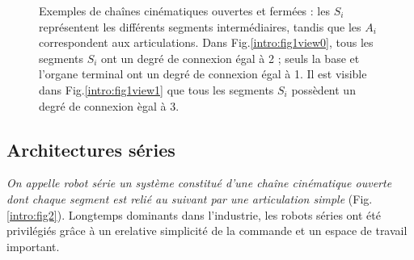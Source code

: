 \begin{figure}[!ht]
  \centering
       \hfill
    \caption{\footnotesize{Exemples de cha\^ines cinématiques ouvertes et fermées : les $S_i$ représentent les différents segments intermédiaires, tandis que les $A_i$ correspondent aux articulations. Dans Fig.\ref{intro:fig1view0}, tous les segments $S_i$ ont un degré de connexion égal à 2 ; seuls la base et l'organe terminal ont un degré de connexion égal à 1. Il est visible dans Fig.\ref{intro:fig1view1} que tous les segments $S_i$ possèdent un degré de connexion ègal à 3.}}
\label{intro:fig1}
\end{figure}

\subsection{Architectures séries} \label{chap0-0-1}

{\it On appelle robot série un système constitué d'une chaîne cinématique ouverte dont chaque segment est relié au suivant par une articulation simple} (Fig.\ref{intro:fig2}). Longtemps dominants dans l'industrie, les robots séries ont été privilégiés grâce à un erelative simplicité de la commande et un espace de travail important.

